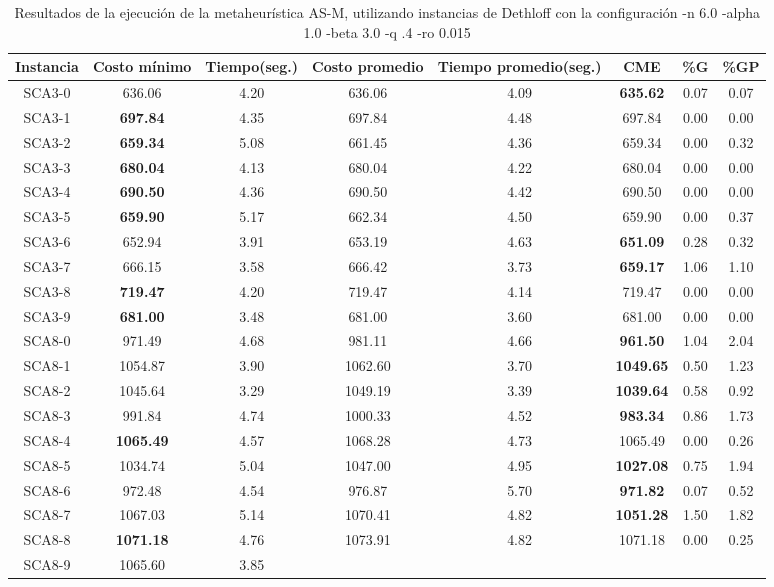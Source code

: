 \begin{table}[h]
\caption{Resultados de la ejecución de la metaheurística AS-M, utilizando instancias de Dethloff con la configuración -n 6.0 -alpha 1.0 -beta 3.0 -q .4 -ro 0.015}
\centering
\small
\begin{tabular}{c c c c c c c c}
\hline\hline
Instancia & Costo mínimo & Tiempo(seg.) & Costo promedio & Tiempo promedio(seg.) & CME & \%G & \%GP \\ [0.5ex]
\hline
SCA3-0 & 636.06 & 4.20 & 
636.06 & 4.09 & \bf{635.62} & 
0.07 & 0.07\\SCA3-1 & \bf{697.84} & 4.35 & 
697.84 & 4.48 & 697.84 & 0.00
 & 0.00\\
SCA3-2 & \bf{659.34} & 5.08 & 
661.45 & 4.36 & 659.34 & 0.00
 & 0.32\\SCA3-3 & \bf{680.04} & 4.13 & 
680.04 & 4.22 & 680.04 & 0.00
 & 0.00\\
SCA3-4 & \bf{690.50} & 4.36 & 
690.50 & 4.42 & 690.50 & 0.00
 & 0.00\\
SCA3-5 & \bf{659.90} & 5.17 & 
662.34 & 4.50 & 659.90 & 0.00
 & 0.37\\SCA3-6 & 652.94 & 3.91 & 
653.19 & 4.63 & \bf{651.09} & 
0.28 & 0.32\\SCA3-7 & 666.15 & 3.58 & 
666.42 & 3.73 & \bf{659.17} & 
1.06 & 1.10\\SCA3-8 & \bf{719.47} & 4.20 & 
719.47 & 4.14 & 719.47 & 0.00
 & 0.00\\
SCA3-9 & \bf{681.00} & 3.48 & 
681.00 & 3.60 & 681.00 & 0.00
 & 0.00\\
SCA8-0 & 971.49 & 4.68 & 
981.11 & 4.66 & \bf{961.50} & 
1.04 & 2.04\\SCA8-1 & 1054.87 & 3.90 & 
1062.60 & 3.70 & \bf{1049.65} & 
0.50 & 1.23\\SCA8-2 & 1045.64 & 3.29 & 
1049.19 & 3.39 & \bf{1039.64} & 
0.58 & 0.92\\SCA8-3 & 991.84 & 4.74 & 
1000.33 & 4.52 & \bf{983.34} & 
0.86 & 1.73\\SCA8-4 & \bf{1065.49} & 4.57 & 
1068.28 & 4.73 & 1065.49 & 0.00
 & 0.26\\SCA8-5 & 1034.74 & 5.04 & 
1047.00 & 4.95 & \bf{1027.08} & 
0.75 & 1.94\\SCA8-6 & 972.48 & 4.54 & 
976.87 & 5.70 & \bf{971.82} & 
0.07 & 0.52\\SCA8-7 & 1067.03 & 5.14 & 
1070.41 & 4.82 & \bf{1051.28} & 
1.50 & 1.82\\SCA8-8 & \bf{1071.18} & 4.76 & 
1073.91 & 4.82 & 1071.18 & 0.00
 & 0.25\\SCA8-9 & 1065.60 & 3.85 & 

\end{tabular}
\end{table}
